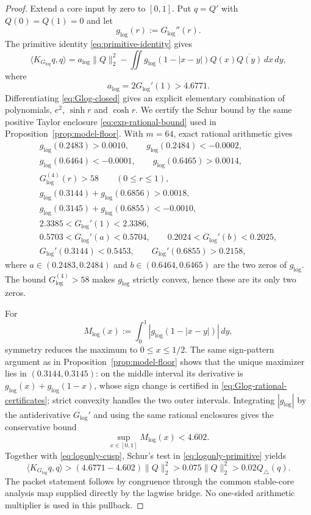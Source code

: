\begin{proof}
Extend a core input by zero to $[0,1]$.  Put
$q=Q'$ with $Q(0)=Q(1)=0$ and let
\[
g_{\log}(r):=G_{\log}''(r).
\]
The primitive identity \eqref{eq:primitive-identity} gives
\begin{equation}
\langle K_{G_{\log}}q,q\rangle
=a_{\log}\|Q\|_2^2
-\iint g_{\log}(1-|x-y|)Q(x)\overline{Q(y)}\,dx\,dy,
\label{eq:logonly-primitive}
\end{equation}
where
\begin{equation}
\boxed{
a_{\log}=2G_{\log}'(1)>4.6771.
}
\label{eq:logonly-cusp}
\end{equation}
Differentiating \eqref{eq:Glog-closed} gives an explicit elementary
combination of polynomials, $e^2$, $\sinh r$ and $\cosh r$.  We certify the
Schur bound by the same positive Taylor enclosure
\eqref{eq:exp-rational-bound} used in Proposition~\ref{prop:model-floor}.
With $m=64$, exact rational arithmetic gives
\begin{equation}
\begin{gathered}
g_{\log}(0.2483)>0.0010,\qquad
g_{\log}(0.2484)<-0.0002,\\
g_{\log}(0.6464)<-0.0001,\qquad
g_{\log}(0.6465)>0.0014,\\
G_{\log}^{(4)}(r)>58\qquad(0\le r\le1),\\
g_{\log}(0.3144)+g_{\log}(0.6856)>0.0018,\\
g_{\log}(0.3145)+g_{\log}(0.6855)<-0.0010,\\
2.3385<G_{\log}'(1)<2.3386,\\
0.5703<G_{\log}'(a)<0.5704,\qquad
0.2024<G_{\log}'(b)<0.2025,\\
G_{\log}'(0.3144)<0.5453,\qquad
G_{\log}'(0.6855)>0.2158,
\end{gathered}
\label{eq:Glog-rational-certificates}
\end{equation}
where $a\in(0.2483,0.2484)$ and
$b\in(0.6464,0.6465)$ are the two zeros of $g_{\log}$.
The bound $G_{\log}^{(4)}>58$ makes $g_{\log}$ strictly convex, hence these
are its only two zeros.

For
\[
M_{\log}(x):=\int_0^1
|g_{\log}(1-|x-y|)|\,dy,
\]
symmetry reduces the maximum to $0\le x\le1/2$.  The same sign-pattern
argument as in Proposition~\ref{prop:model-floor} shows that the unique
maximizer lies in $(0.3144,0.3145)$: on the middle interval its derivative is
$g_{\log}(x)+g_{\log}(1-x)$, whose sign change is certified in
\eqref{eq:Glog-rational-certificates}; strict convexity handles the two outer
intervals.  Integrating $|g_{\log}|$ by the antiderivative
$G_{\log}'$ and using the same rational enclosures gives the conservative
bound
\begin{equation}
\boxed{
\sup_{x\in[0,1]}M_{\log}(x)<4.602.
}
\label{eq:Glog-Schur}
\end{equation}
Together with \eqref{eq:logonly-cusp}, Schur's test in
\eqref{eq:logonly-primitive} yields
\[
\langle K_{G_{\log}}q,q\rangle
>(4.6771-4.602)\|Q\|_2^2
>0.075\|Q\|_2^2
>0.02Q_\triangle(q).
\]
The packet statement follows by congruence through the common stable-core
analysis map supplied directly by the lagwise bridge.  No one-sided arithmetic
multiplier is used in this pullback.
\end{proof}

